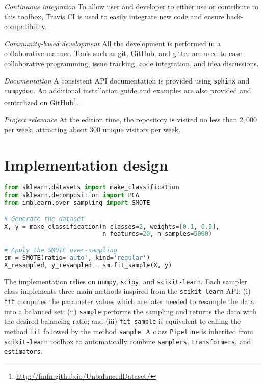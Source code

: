 \documentclass[twoside,11pt]{article}
\begin{document}
\noindent\textit{Continuous integration} To allow user and developer to either use or contribute to this toolbox, Travis CI is used to easily integrate new code and ensure back-compatibility.

\noindent\textit{Community-based development} All the development is performed in a collaborative manner.
Tools such as git, GitHub, and gitter are used to ease collaborative programming, issue tracking, code integration, and idea discussions.

\noindent\textit{Documentation} A consistent API documentation is provided using \texttt{sphinx} and \texttt{numpydoc}.
An additional installation guide and examples are also provided and centralized on GitHub\footnote{\url{http://fmfn.github.io/UnbalancedDataset/}}.

\noindent\textit{Project relevance} At the edition time, the repository is visited no less than $2,000$ per week, attracting about $300$ unique visitors per week.

\section{Implementation design}

\begin{lstlisting}[language=Python, caption=Code snippet to over-sample a dataset using SMOTE.]
from sklearn.datasets import make_classification
from sklearn.decomposition import PCA
from imblearn.over_sampling import SMOTE

# Generate the dataset
X, y = make_classification(n_classes=2, weights=[0.1, 0.9],
                           n_features=20, n_samples=5000)

# Apply the SMOTE over-sampling
sm = SMOTE(ratio='auto', kind='regular')
X_resampled, y_resampled = sm.fit_sample(X, y)
\end{lstlisting}

The implementation relies on \texttt{numpy}, \texttt{scipy}, and \texttt{scikit-learn}.
Each sampler class implements three main methods inspired from the \texttt{scikit-learn} API:
(i) \texttt{fit} computes the parameter values which are later needed to resample the data into a balanced set;
(ii) \texttt{sample} performs the sampling and returns the data with the desired balancing ratio;
and (iii) \texttt{fit\_sample} is equivalent to calling the method \texttt{fit} followed by the method \texttt{sample}.
A class \texttt{Pipeline} is inherited from \texttt{scikit-learn} toolbox to automatically combine \texttt{samplers}, \texttt{transformers}, and \texttt{estimators}.
\end{document}
